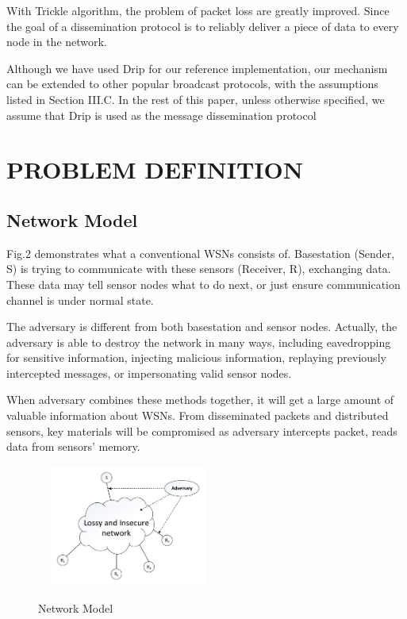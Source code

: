\documentclass{sig-alternate-05-2015}
\begin{document}
With Trickle algorithm, the problem of packet loss are greatly improved. Since the goal of a dissemination protocol is to reliably deliver a piece of data to every node in the network.
	
	Although we have used Drip for our reference implementation, our mechanism can be extended to other popular broadcast protocols, with the assumptions listed in Section III.C. In the rest of this paper, unless otherwise specified, we assume that Drip is used as the message dissemination protocol

\section{ PROBLEM DEFINITION}
\subsection{Network Model}
	Fig.2 demonstrates what a conventional WSNs consists of. Basestation (Sender, S) is trying to communicate with these sensors (Receiver, R), exchanging data. These data may tell sensor nodes what to do next, or just ensure communication channel is under normal state.
	
The adversary is different from both basestation and sensor nodes. Actually, the adversary is able to destroy the network in many ways, including eavedropping for sensitive information, injecting malicious information, replaying previously intercepted messages, or impersonating valid sensor nodes.

When adversary combines these methods together, it will get a large amount of valuable information about WSNs. From disseminated packets and distributed sensors, key materials will be  compromised as adversary intercepts packet, reads data from sensors' memory.
	
\begin{figure}
\centering
\includegraphics[width=6cm,height=4cm]{NetworkModel.pdf}\\
\caption{Network Model}\label{} 
\end{figure}
\end{document}
